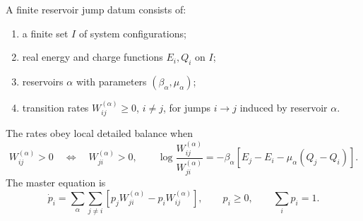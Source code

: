 \begin{definition}
\label{def:finite-reservoir-jump-datum}
A finite reservoir jump datum consists of:
\begin{enumerate}
\item a finite set \(I\) of system configurations;
\item real energy and charge functions \(E_i,Q_i\) on \(I\);
\item reservoirs \(\alpha\) with parameters \((\beta_\alpha,\mu_\alpha)\);
\item transition rates \(W^{(\alpha)}_{ij}\ge0\), \(i\ne j\), for jumps
  \(i\to j\) induced by reservoir \(\alpha\).
\end{enumerate}
The rates obey local detailed balance when
\begin{equation}
  W^{(\alpha)}_{ij}>0
  \quad\Longleftrightarrow\quad
  W^{(\alpha)}_{ji}>0,
  \qquad
  \log\frac{W^{(\alpha)}_{ij}}{W^{(\alpha)}_{ji}}
  =
  -\beta_\alpha
  \left[
    E_j-E_i-\mu_\alpha(Q_j-Q_i)
  \right].
  \label{eq:finite-local-detailed-balance}
\end{equation}
The master equation is
\begin{equation}
  \dot p_i
  =
  \sum_{\alpha}\sum_{j\ne i}
  \left[
    p_jW^{(\alpha)}_{ji}-p_iW^{(\alpha)}_{ij}
  \right],
  \qquad p_i\ge0,\qquad \sum_i p_i=1 .
  \label{eq:finite-reservoir-master-equation}
\end{equation}
\end{definition}

